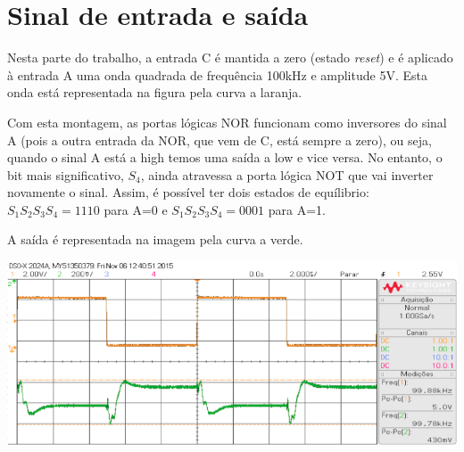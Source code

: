 \documentclass[a4paper,11pt]{report}
\begin{document}
\section{Sinal de entrada e saída}
Nesta parte do trabalho, a entrada C é mantida a zero (estado \textit{reset}) e é aplicado à entrada A uma onda quadrada de frequência 100kHz e amplitude 5V. Esta onda está representada na figura pela curva a laranja.\par
Com esta montagem, as portas lógicas NOR funcionam como inversores do sinal A (pois a outra entrada da NOR, que vem de C, está sempre a zero), ou seja, quando o sinal A está a high temos uma saída a low e vice versa. No entanto, o bit mais significativo, $S_4$, ainda atravessa a porta lógica NOT que vai inverter novamente o sinal.
Assim, é possível ter dois estados de equílibrio: $S_1S_2S_3S_4 = 1110$ para A=0 e $S_1S_2S_3S_4 = 0001$ para A=1.\par
A saída é representada na imagem pela curva a verde.
\begin{center}
     \includegraphics[angle=0,width=1\textwidth]{7_2_1_Sinal_io}
     \label{7_2_1}
\end{center}
\end{document}
